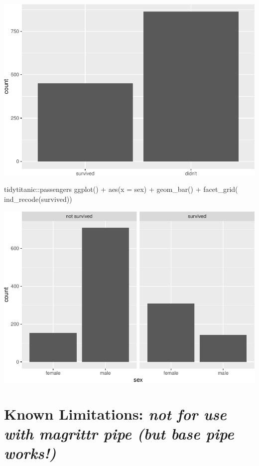 \begin{Schunk}
\includegraphics[width=0.69\linewidth]{r_journal_files/figure-latex/unnamed-chunk-13-3} \begin{Sinput}
tidytitanic::passengers %
ggplot() + 
  aes(x = sex) + 
  geom_bar() + 
  facet_grid(~ ind_recode(survived))
\end{Sinput}

\includegraphics[width=0.69\linewidth]{r_journal_files/figure-latex/unnamed-chunk-13-4} \end{Schunk}

\hypertarget{known-limitations-not-for-use-with-magrittr-pipe-but-base-pipe-works}{%
\section{\texorpdfstring{Known Limitations: \emph{not for use with
magrittr pipe (but base pipe
works!)}}{Known Limitations: not for use with magrittr pipe (but base pipe works!)}}\label{known-limitations-not-for-use-with-magrittr-pipe-but-base-pipe-works}}

